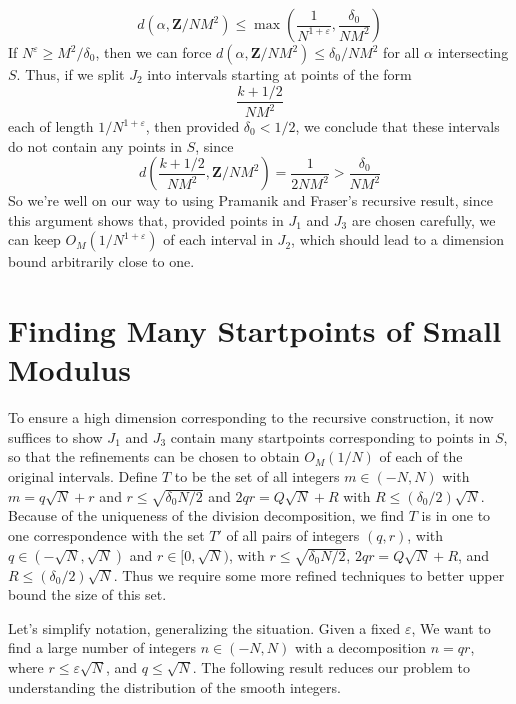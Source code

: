 \documentclass{report}
\theoremstyle{plain}
\theoremstyle{plain}
\begin{document}
%
\[ d(\alpha, \mathbf{Z}/NM^2) \leq \max \left( \frac{1}{N^{1+\varepsilon}} , \frac{\delta_0}{NM^2} \right) \]
%
If $N^\varepsilon \geq M^2/\delta_0$, then we can force $d(\alpha, \mathbf{Z}/NM^2) \leq \delta_0/NM^2$ for all $\alpha$ intersecting $S$. Thus, if we split $J_2$ into intervals starting at points of the form
%
\[ \frac{k + 1/2}{NM^2} \]
%
each of length $1/N^{1+\varepsilon}$, then provided $\delta_0 < 1/2$, we conclude that these intervals do not contain any points in $S$, since
%
\[ d \left( \frac{k + 1/2}{NM^2}, \mathbf{Z}/NM^2 \right) = \frac{1}{2NM^2} > \frac{\delta_0}{NM^2} \]
%
So we're well on our way to using Pramanik and Fraser's recursive result, since this argument shows that, provided points in $J_1$ and $J_3$ are chosen carefully, we can keep $O_M(1/N^{1 + \varepsilon})$ of each interval in $J_2$, which should lead to a dimension bound arbitrarily close to one.

\section{Finding Many Startpoints of Small Modulus}

To ensure a high dimension corresponding to the recursive construction, it now suffices to show $J_1$ and $J_3$ contain many startpoints corresponding to points in $S$, so that the refinements can be chosen to obtain $O_M(1/N)$ of each of the original intervals. Define $T$ to be the set of all integers $m \in (-N,N)$ with $m = q \sqrt{N} + r$ and $r \leq \sqrt{\delta_0 N/2}$ and $2qr = Q\sqrt{N} + R$ with $R \leq (\delta_0/2) \sqrt{N}$. Because of the uniqueness of the division decomposition, we find $T$ is in one to one correspondence with the set $T'$ of all pairs of integers $(q,r)$, with $q \in (-\sqrt{N},\sqrt{N})$ and $r \in [0,\sqrt{N})$, with $r \leq \sqrt{\delta_0 N/2}$, $2qr = Q \sqrt{N} + R$, and $R \leq (\delta_0/2) \sqrt{N}$. Thus we require some more refined techniques to better upper bound the size of this set.

Let's simplify notation, generalizing the situation. Given a fixed $\varepsilon$, We want to find a large number of integers $n \in (-N,N)$ with a decomposition $n = qr$, where $r \leq \varepsilon \sqrt{N}$, and $q \leq \sqrt{N}$. The following result reduces our problem to understanding the distribution of the smooth integers.
\end{document}
